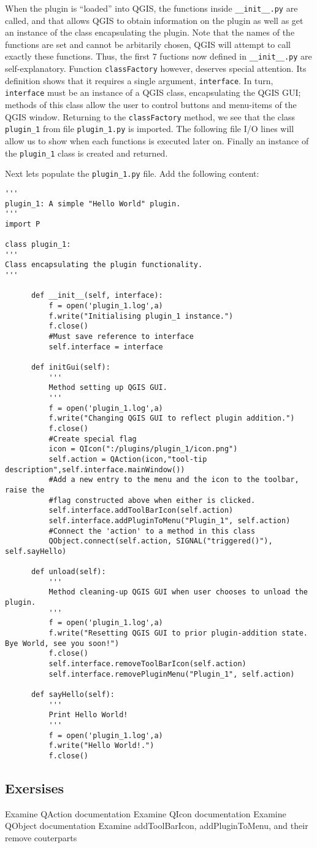 When the plugin is ``loaded'' into QGIS, the functions inside \lstinline{__init__.py} are called, and that allows QGIS to obtain information on the plugin as well as get an instance of the class encapsulating the plugin. Note that the names of the functions are set and cannot be arbitarily chosen, QGIS will attempt to call exactly these functions. Thus, the first $7$ fuctions now defined in \lstinline{__init__.py} are self-explanatory. Function \lstinline{classFactory} however, deserves special attention. Its definition shows that it requires a single argument, \lstinline{interface}. In turn, \lstinline{interface} must be an instance of a QGIS class, encapsulating the QGIS GUI; methods of this class allow the user to control buttons and menu-items of the QGIS window. Returning to the \lstinline{classFactory} method, we see that the class \lstinline{plugin_1} from file \lstinline{plugin_1.py} is imported. The following file I/O lines will allow us to show when each functions is executed later on. Finally an instance of the \lstinline{plugin_1} class is created and returned.
\par%
Next lets populate the \lstinline{plugin_1.py} file. Add the following content:
\begin{lstlisting}
'''
plugin_1: A simple "Hello World" plugin.
'''
import P

class plugin_1:
'''
Class encapsulating the plugin functionality.
'''

      def __init__(self, interface):
          f = open('plugin_1.log',a)
          f.write("Initialising plugin_1 instance.")
          f.close()
          #Must save reference to interface
          self.interface = interface

      def initGui(self):
          '''
          Method setting up QGIS GUI.
          '''
          f = open('plugin_1.log',a)
          f.write("Changing QGIS GUI to reflect plugin addition.")
          f.close()
          #Create special flag
          icon = QIcon(":/plugins/plugin_1/icon.png")
          self.action = QAction(icon,"tool-tip description",self.interface.mainWindow())
          #Add a new entry to the menu and the icon to the toolbar, raise the 
          #flag constructed above when either is clicked.
          self.interface.addToolBarIcon(self.action)
          self.interface.addPluginToMenu("Plugin_1", self.action)
          #Connect the 'action' to a method in this class
          QObject.connect(self.action, SIGNAL("triggered()"), self.sayHello)

      def unload(self):
          '''
          Method cleaning-up QGIS GUI when user chooses to unload the plugin.
          '''
          f = open('plugin_1.log',a)
          f.write("Resetting QGIS GUI to prior plugin-addition state. Bye World, see you soon!")
          f.close()
          self.interface.removeToolBarIcon(self.action)
          self.interface.removePluginMenu("Plugin_1", self.action)

      def sayHello(self):
          '''
          Print Hello World!
          '''
          f = open('plugin_1.log',a)
          f.write("Hello World!.")
          f.close()

\end{lstlisting}

\subsection{Exersises}
Examine QAction documentation
Examine QIcon documentation
Examine QObject documentation
Examine addToolBarIcon, addPluginToMenu, and their remove couterparts
